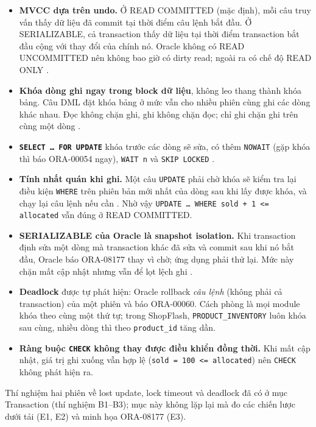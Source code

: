 \begin{itemize}
  \item \textbf{MVCC dựa trên undo.} Ở READ COMMITTED (mặc định), mỗi câu truy vấn thấy dữ liệu đã commit tại thời điểm câu lệnh bắt đầu. Ở SERIALIZABLE, cả transaction thấy dữ liệu tại thời điểm transaction bắt đầu cộng với thay đổi của chính nó. Oracle không có READ UNCOMMITTED nên không bao giờ có dirty read; ngoài ra có chế độ READ ONLY \cite{cc-oracle-concepts, cc-oracle-set-transaction}.
  \item \textbf{Khóa dòng ghi ngay trong block dữ liệu}, không leo thang thành khóa bảng. Câu DML đặt khóa bảng ở mức vẫn cho nhiều phiên cùng ghi các dòng khác nhau. Đọc không chặn ghi, ghi không chặn đọc; chỉ ghi chặn ghi trên cùng một dòng \cite{cc-oracle-concepts}.
  \item \textbf{\texttt{SELECT \ldots{} FOR UPDATE}} khóa trước các dòng sẽ sửa, có thêm \texttt{NOWAIT} (gặp khóa thì báo ORA-00054 ngay), \texttt{WAIT n} và \texttt{SKIP LOCKED} \cite{cc-oracle-select}.
  \item \textbf{Tính nhất quán khi ghi.} Một câu \texttt{UPDATE} phải chờ khóa sẽ kiểm tra lại điều kiện \texttt{WHERE} trên phiên bản mới nhất của dòng sau khi lấy được khóa, và chạy lại câu lệnh nếu cần \cite{cc-oracle-concepts}. Nhờ vậy \texttt{UPDATE \ldots{} WHERE sold + 1 <= allocated} vẫn đúng ở READ COMMITTED.
  \item \textbf{SERIALIZABLE của Oracle là snapshot isolation.} Khi transaction định sửa một dòng mà transaction khác đã sửa và commit sau khi nó bắt đầu, Oracle báo ORA-08177 thay vì chờ; ứng dụng phải thử lại. Mức này chặn mất cập nhật nhưng vẫn để lọt lệch ghi \cite{cc-berenson1995}.
  \item \textbf{Deadlock} được tự phát hiện: Oracle rollback \emph{câu lệnh} (không phải cả transaction) của một phiên và báo ORA-00060. Cách phòng là mọi module khóa theo cùng một thứ tự; trong ShopFlash, \texttt{PRODUCT\_INVENTORY} luôn khóa sau cùng, nhiều dòng thì theo \texttt{product\_id} tăng dần.
  \item \textbf{Ràng buộc \texttt{CHECK} không thay được điều khiển đồng thời.} Khi mất cập nhật, giá trị ghi xuống vẫn hợp lệ (\texttt{sold = 100 <= allocated}) nên \texttt{CHECK} không phát hiện ra.
\end{itemize}

Thí nghiệm hai phiên về lost update, lock timeout và deadlock đã có ở mục Transaction (thí nghiệm B1--B3); mục này không lặp lại mà đo các chiến lược dưới tải (E1, E2) và minh họa ORA-08177 (E3).

